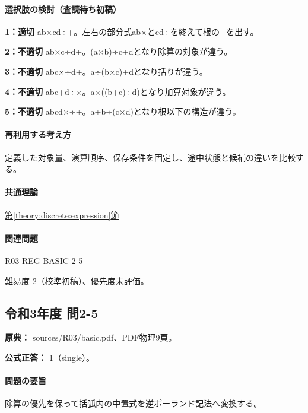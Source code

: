 \paragraph{選択肢の検討（査読待ち初稿）}\mbox{}\par

\noindent\textbf{1：適切} ab×cd÷+。左右の部分式ab×とcd÷を終えて根の+を出す。\par

\noindent\textbf{2：不適切} ab×c÷d+。(a×b)÷c+dとなり除算の対象が違う。\par

\noindent\textbf{3：不適切} abc×÷d+。a÷(b×c)+dとなり括りが違う。\par

\noindent\textbf{4：不適切} abc+d÷×。a×((b+c)÷d)となり加算対象が違う。\par

\noindent\textbf{5：不適切} abcd×÷+。a+b÷(c×d)となり根以下の構造が違う。\par

\paragraph{再利用する考え方} 定義した対象量、演算順序、保存条件を固定し、途中状態と候補の違いを比較する。

\paragraph{共通理論} \hyperref[theory:discrete:expression]{第\ref*{theory:discrete:expression}節}

\paragraph{関連問題} \hyperref[q:r03-reg-basic-2-5]{R03-REG-BASIC-2-5}

\par 難易度 2（校準初稿）、優先度未評価。

\subsection{令和3年度 問2-5}
\label{q:r03-reg-basic-2-5}

\noindent\textbf{原典：} sources/R03/basic.pdf、PDF物理9頁。

\textbf{公式正答：} 1（single）。

\paragraph{問題の要旨} 除算の優先を保って括弧内の中置式を逆ポーランド記法へ変換する。

